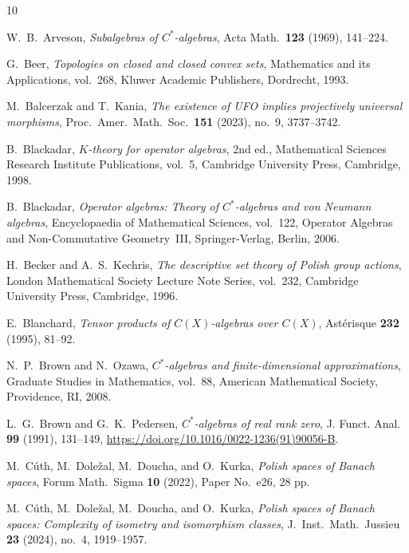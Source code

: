 \documentclass[12pt,fleqn,a4paper]{amsart}
\numberwithin{equation}{section}
\theoremstyle{definition}
\begin{document}

\begin{thebibliography}{10}

W.~B.~Arveson,
\emph{Subalgebras of $C^*$-algebras},
Acta Math.\ \textbf{123} (1969), 141--224.

G.~Beer,
\emph{Topologies on closed and closed convex sets},
Mathematics and its Applications, vol.~268,
Kluwer Academic Publishers, Dordrecht, 1993.

M.~Balcerzak and T.~Kania,
\emph{The existence of UFO implies projectively universal morphisms},
Proc.\ Amer.\ Math.\ Soc.\ \textbf{151} (2023), no.~9, 3737--3742.

B.~Blackadar,
\emph{$K$-theory for operator algebras},
2nd ed., Mathematical Sciences Research Institute Publications, vol.~5,
Cambridge University Press, Cambridge, 1998.

B.~Blackadar,
\emph{Operator algebras: Theory of $C^*$-algebras and von Neumann algebras},
Encyclopaedia of Mathematical Sciences, vol.~122, Operator Algebras and
Non-Commutative Geometry~III,
Springer-Verlag, Berlin, 2006.

H.~Becker and A.~S.~Kechris,
\emph{The descriptive set theory of Polish group actions},
London Mathematical Society Lecture Note Series, vol.~232,
Cambridge University Press, Cambridge, 1996.

E.~Blanchard,
\emph{Tensor products of $C(X)$-algebras over $C(X)$},
Ast\'erisque \textbf{232} (1995), 81--92.


N.~P.~Brown and N.~Ozawa,
\emph{$C^*$-algebras and finite-dimensional approximations},
Graduate Studies in Mathematics, vol.~88,
American Mathematical Society, Providence, RI, 2008.

L.~G.~Brown and G.~K.~Pedersen,
\emph{$C^*$-algebras of real rank zero},
J. Funct. Anal. \textbf{99} (1991), 131--149,
\url{https://doi.org/10.1016/0022-1236(91)90056-B}.

M.~C{\'u}th, M.~Dole\v{z}al, M.~Doucha, and O.~Kurka,
\emph{Polish spaces of Banach spaces},
Forum Math.\ Sigma \textbf{10} (2022), Paper No.~e26, 28 pp.

M.~C{\'u}th, M.~Dole\v{z}al, M.~Doucha, and O.~Kurka,
\emph{Polish spaces of Banach spaces: Complexity of isometry and isomorphism classes},
J.\ Inst.\ Math.\ Jussieu \textbf{23} (2024), no.~4, 1919--1957.


\end{thebibliography}
\end{document}
